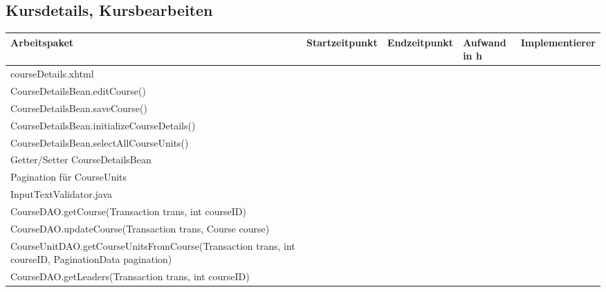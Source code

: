 \begin{landscape}
	\subsection{Kursdetails, Kursbearbeiten}
	\begin{tabular}{|p{10cm}|p{4cm}|p{3cm}|p{3cm}|p{3cm}|}
		\hline  \textbf{Arbeitspaket} & \textbf{Startzeitpunkt} & \textbf{Endzeitpunkt} & \textbf{Aufwand in h} & \textbf{Implementierer} \\ 
		\hline   courseDetails.xhtml                                         &                            &                             &                     &\\
		\hline   CourseDetailsBean.editCourse()                              &                            &                             &                     &\\
		\hline   CourseDetailsBean.saveCourse()                              &                            &                             &                     &\\
		\hline   CourseDetailsBean.initializeCourseDetails()                 &                            &                             &                     &\\
		\hline   CourseDetailsBean.selectAllCourseUnits()                    &                            &                             &                     &\\
		\hline   Getter/Setter CourseDetailsBean                             &                            &                             &                     &\\
		\hline   Pagination für CourseUnits                                  &                            &                             &                     &\\
		\hline   InputTextValidator.java                                     &                            &                             &                     &\\ 
		\hline   CourseDAO.getCourse(Transaction trans, int courseID)        &                            &                             &                     &\\ 
		\hline   CourseDAO.updateCourse(Transaction trans, Course course)    &                            &                             &                     &\\
		\hline   CourseUnitDAO.getCourseUnitsFromCourse(Transaction trans, int courseID, PaginationData pagination) &                            &                             &                     &\\
		\hline   CourseDAO.getLeaders(Transaction trans, int courseID)    &                            &                             &                     &\\
		\hline 
	\end{tabular} \ \\
	\ \\
	

\end{landscape}
